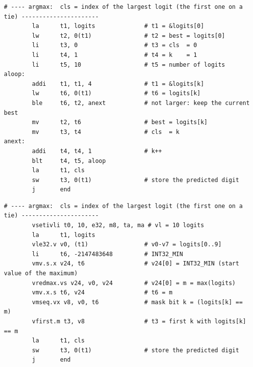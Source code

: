 \documentclass[11pt,a4paper]{article}
\begin{document}
\begin{lstlisting}[style=asm]
# ---- argmax:  cls = index of the largest logit (the first one on a tie) ----------------------
        la      t1, logits              # t1 = &logits[0]
        lw      t2, 0(t1)               # t2 = best = logits[0]
        li      t3, 0                   # t3 = cls  = 0
        li      t4, 1                   # t4 = k    = 1
        li      t5, 10                  # t5 = number of logits
aloop:
        addi    t1, t1, 4               # t1 = &logits[k]
        lw      t6, 0(t1)               # t6 = logits[k]
        ble     t6, t2, anext           # not larger: keep the current best
        mv      t2, t6                  # best = logits[k]
        mv      t3, t4                  # cls  = k
anext:
        addi    t4, t4, 1               # k++
        blt     t4, t5, aloop
        la      t1, cls
        sw      t3, 0(t1)               # store the predicted digit
        j       end
\end{lstlisting}
\begin{lstlisting}[style=asm]
# ---- argmax:  cls = index of the largest logit (the first one on a tie) ----------------------
        vsetivli t0, 10, e32, m8, ta, ma # vl = 10 logits
        la      t1, logits
        vle32.v v0, (t1)                # v0-v7 = logits[0..9]
        li      t6, -2147483648         # INT32_MIN
        vmv.s.x v24, t6                 # v24[0] = INT32_MIN (start value of the maximum)
        vredmax.vs v24, v0, v24         # v24[0] = m = max(logits)
        vmv.x.s t6, v24                 # t6 = m
        vmseq.vx v8, v0, t6             # mask bit k = (logits[k] == m)
        vfirst.m t3, v8                 # t3 = first k with logits[k] == m
        la      t1, cls
        sw      t3, 0(t1)               # store the predicted digit
        j       end
\end{lstlisting}
\end{document}
